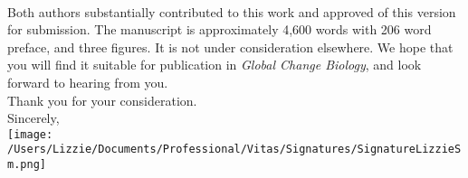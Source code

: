\documentclass[11pt,a4paper]{article}
\begin{document}
\vspace{1.5ex}\\
Both authors substantially contributed to this work and approved of this version for submission. The manuscript is approximately 4,600 words with 206 word preface, and three figures. It is not under consideration elsewhere. We hope that you will find it suitable for publication in \emph{Global Change Biology}, and look forward to hearing from you.
\vspace{1.5ex}\\
Thank you for your consideration.
\vspace{1.5ex}\\
\noindent Sincerely,\\

 \texttt{[image: /Users/Lizzie/Documents/Professional/Vitas/Signatures/SignatureLizzieSm.png]} 
\newpage
{}
\vspace{-5ex}

\renewcommand{\refname}{\CHead{}}

\end{document}
